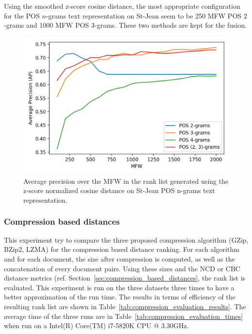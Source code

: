 Using the smoothed z-score cosine distance, the most appropriate configuration for the POS $n$-grams text representation on St-Jean seem to be 250 MFW POS $2$-grams and 1000 MFW POS $3$-grams.
These two methods are kept for the fusion.

\begin{figure}
  \centering
  \caption{Average precision over the MFW in the rank list generated using the z-score normalized cosine distance on St-Jean POS n-grams text representation.}
  \label{fig:pos_ngrams}
  \includegraphics[width=\linewidth]{img/pos_ngrams.png}
\end{figure}

\subsubsection{Compression based distances}

This experiment try to compare the three proposed compression algorithm (GZip, BZip2, LZMA) for the compression based distance ranking.
For each algorithm and for each document, the size after compression is computed, as well as the concatenation of every document pairs.
Using these sizes and the NCD or CBC distance metrics (ref. Section~\ref{sec:compression_based_distances}, the rank list is evaluated.
This experiment is run on the three datasets three times to have a better approximation of the run time.
The results in terms of efficiency of the resulting rank list are shown in Table~\ref{tab:compression_evaluation_results}.
The average time of the three runs are in Table~\ref{tab:compression_evaluation_times} when run on a Intel(R) Core(TM) i7-5820K CPU @ 3.30GHz.


